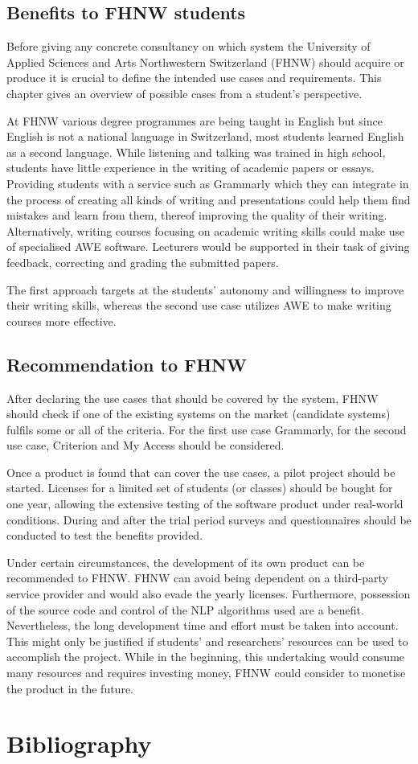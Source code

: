 \documentclass[runningheads]{llncs}
\let\OldTextregistered\textregistered
\renewcommand{\textregistered}{\OldTextregistered\xspace}
\begin{document}
\subsection{Benefits to FHNW students}
Before giving any concrete consultancy on which system the University of Applied Sciences and Arts Northwestern Switzerland (FHNW) should acquire or produce it is crucial to define the intended use cases and requirements. This chapter gives an overview of possible cases from a student's perspective.

At FHNW various degree programmes are being taught in English \citep{noauthor_fhnw_nodate} but since English is not a national language in Switzerland, most students learned English as a second language. While listening and talking was trained in high school, students have little experience in the writing of academic papers or essays. Providing students with a service such as Grammarly\textregistered which they can integrate in the process of creating all kinds of writing and presentations could help them find mistakes and learn from them, thereof improving the quality of their writing. Alternatively, writing courses focusing on academic writing skills could make use of specialised AWE software. Lecturers would be supported in their task of giving feedback, correcting and grading the submitted papers.

The first approach targets at the students' autonomy and willingness to improve their writing skills, whereas the second use case utilizes AWE to make writing courses more effective. 

\subsection{Recommendation to FHNW}
After declaring the use cases that should be covered by the system, FHNW should check if one of the existing systems on the market (candidate systems) fulfils some or all of the criteria. For the first use case Grammarly\textregistered, for the second use case, Criterion\textregistered and My Access should be considered. 

Once a product is found that can cover the use cases, a pilot project should be started. Licenses for a limited set of students (or classes) should be bought for one year, allowing the extensive testing of the software product under real-world conditions. During and after the trial period surveys and questionnaires should be conducted to test the benefits provided. 

Under certain circumstances, the development of its own product can be recommended to FHNW. FHNW can avoid being dependent on a third-party service provider and would also evade the yearly licenses. Furthermore, possession of the source code and control of the NLP algorithms used are a benefit. Nevertheless, the long development time and effort must be taken into account. This might only be justified if students' and researchers' resources can be used to accomplish the project. While in the beginning, this undertaking would consume many resources and requires investing money, FHNW could consider to monetise the product in the future.

\section{Bibliography}


\printbibliography
\end{document}
